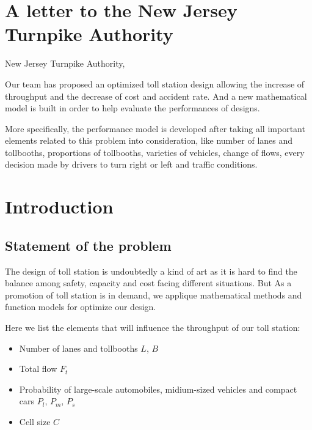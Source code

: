 \documentclass{mcmthesis}
\begin{document}
\section{A letter to the New Jersey Turnpike Authority}


New Jersey Turnpike Authority,

Our team has proposed an optimized toll station design allowing the increase of throughput and the decrease of cost and accident rate. And a new mathematical model is built in order to help evaluate the performances of designs. 

More specifically, the performance model is developed after taking all important elements related to this problem into consideration, like number of lanes and tollbooths, proportions of tollbooths, varieties of vehicles, change of flows, every decision made by drivers to turn right or left and traffic conditions. 



\section{Introduction}

\subsection{Statement of the problem}
The design of toll station is undoubtedly a kind of art as it is hard to find the balance among safety, capacity and cost facing different situations. But As a promotion of toll station is in demand, we applique mathematical methods and function models for optimize our design.

Here we list the elements that will influence the throughput of our toll station:
\begin{itemize}
\item Number of lanes and tollbooths $L$, $B$
\item Total flow $F_t$
\item Probability of large-scale automobiles, midium-sized vehicles and compact cars $P_l$,  $P_m$, $P_s$
\item Cell size $C$
\end{itemize}







\begin{Theorem} \label{thm:latex}

\end{Theorem}
\end{document}
